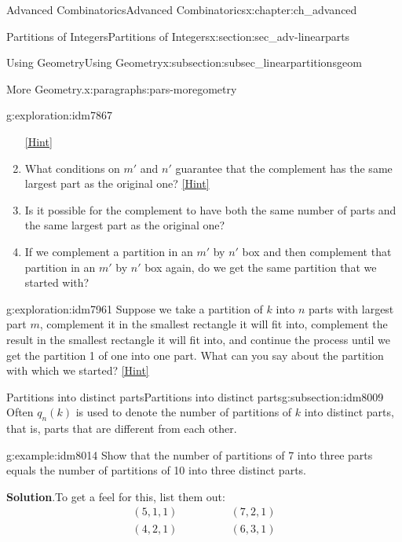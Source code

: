 \documentclass[oneside,10pt,]{book}
\numberwithin{equation}{chapter}
\newcommand{\amp}{&}
\begin{document}
\begin{chapterptx}{Advanced Combinatorics}{}{Advanced Combinatorics}{}{}{x:chapter:ch_advanced}
\begin{sectionptx}{Partitions of Integers}{}{Partitions of Integers}{}{}{x:section:sec_adv-linearparts}
\begin{subsectionptx}{Using Geometry}{}{Using Geometry}{}{}{x:subsection:subsec_linearpartitionsgeom}
\begin{paragraphs}{More Geometry.}{x:paragraphs:pars-moregometry}
\begin{exploration}{}{g:exploration:idm7867}
\begin{enumerate}[font=\bfseries,label=(\alph*),ref=\alph*]
\space\hspace*{0pt}\hfill{\tiny\hyperlink{g:hint:idm7904-back}{[Hint]}}\item{}What conditions on \(m'\) and \(n'\) guarantee that the complement has the same largest part as the original one?%
\space\hspace*{0pt}\hfill{\tiny\hyperlink{g:hint:idm7921-back}{[Hint]}}\item{}Is it possible for the complement to have both the same number of parts and the same largest part as the original one?%
\item{}If we complement a partition in an \(m'\) by \(n'\) box and then complement that partition in an \(m'\) by \(n'\) box again, do we get the same partition that we started with?%
\end{enumerate}
\end{exploration}
\begin{exploration}{}{g:exploration:idm7961}%
Suppose we take a partition of \(k\) into \(n\) parts with largest part \(m\), complement it in the smallest rectangle it will fit into, complement the result in the smallest rectangle it will fit into, and continue the process until we get the partition 1 of one into one part.  What can you say about the partition with which we started?%
\space\hspace*{0pt}\hfill{\tiny\hyperlink{g:hint:idm7967-back}{[Hint]}}\end{exploration}
\end{paragraphs}%
\end{subsectionptx}
%
%
\typeout{************************************************}
\typeout{************************************************}
%
\begin{subsectionptx}{Partitions into distinct parts}{}{Partitions into distinct parts}{}{}{g:subsection:idm8009}
Often \(q_n(k)\) is used to denote the number of partitions of \(k\) into distinct parts, that is, parts that are different from each other.%
\begin{example}{}{g:example:idm8014}%
Show that the number of partitions of 7 into three parts equals the number of partitions of 10 into three distinct parts.%
\par\smallskip%
\noindent\textbf{Solution}.\hypertarget{g:solution:idm8017}{}\quad{}To get a feel for this, list them out:%
\begin{align*}
(5,1,1) \qquad \amp \qquad (7,2,1)\\
(4,2,1) \qquad \amp \qquad (6,3,1)\\

\end{align*}
\end{example}
\end{subsectionptx}
\end{sectionptx}
\end{chapterptx}
\end{document}
